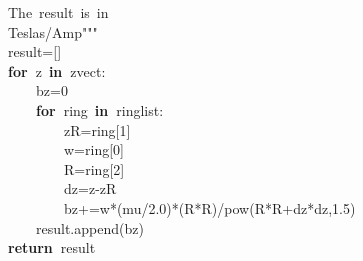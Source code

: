 \documentclass{article}
\newcommand{\hlstd}[1]{\textcolor[rgb]{0,0,0}{#1}}
\newcommand{\hlnum}[1]{\textcolor[rgb]{0.16,0.16,1}{#1}}
\newcommand{\hlstr}[1]{\textcolor[rgb]{1,0,0}{#1}}
\newcommand{\hlsym}[1]{\textcolor[rgb]{0,0,0}{#1}}
\newcommand{\hlkwa}[1]{\textcolor[rgb]{0,0,0}{\bf{#1}}}
\newcommand{\hlkwb}[1]{\textcolor[rgb]{0.51,0,0}{#1}}
\newcommand{\hlkwd}[1]{\textcolor[rgb]{0,0,0.51}{#1}}
\begin{document}
\hlstr{}\hlstd{\ \ \ \ }\hlstr{The\ result\ is\ in}\hspace*{\fill}\\
\hlstr{}\hlstd{\ \ \ \ }\hlstr{Teslas/Amp"""}\hlstd{\hspace*{\fill}\\
}\hlstd{\ \ \ \ }\hlstd{result}\hlsym{={[}{]}}\hspace*{\fill}\\
\hlstd{}\hlstd{\ \ \ \ }\hlstd{}\hlkwa{for\ }\hlstd{z\ }\hlkwa{in\ }\hlstd{zvect}\hlsym{:}\hspace*{\fill}\\
\hlstd{}\hlstd{\ \ \ \ \ \ \ \ }\hlstd{bz}\hlsym{=}\hlstd{}\hlnum{0}\hspace*{\fill}\\
\hlstd{}\hlstd{\ \ \ \ \ \ \ \ }\hlstd{}\hlkwa{for\ }\hlstd{ring\ }\hlkwa{in\ }\hlstd{ringlist}\hlsym{:}\hspace*{\fill}\\
\hlstd{}\hlstd{\ \ \ \ \ \ \ \ \ \ \ \ }\hlstd{zR}\hlsym{=}\hlstd{ring}\hlsym{{[}}\hlstd{}\hlnum{1}\hlstd{}\hlsym{{]}}\hspace*{\fill}\\
\hlstd{}\hlstd{\ \ \ \ \ \ \ \ \ \ \ \ }\hlstd{w}\hlsym{=}\hlstd{ring}\hlsym{{[}}\hlstd{}\hlnum{0}\hlstd{}\hlsym{{]}}\hspace*{\fill}\\
\hlstd{}\hlstd{\ \ \ \ \ \ \ \ \ \ \ \ }\hlstd{R}\hlsym{=}\hlstd{ring}\hlsym{{[}}\hlstd{}\hlnum{2}\hlstd{}\hlsym{{]}}\hspace*{\fill}\\
\hlstd{}\hlstd{\ \ \ \ \ \ \ \ \ \ \ \ }\hlstd{dz}\hlsym{=}\hlstd{z}\hlsym{{-}}\hlstd{zR\hspace*{\fill}\\
}\hlstd{\ \ \ \ \ \ \ \ \ \ \ \ }\hlstd{bz}\hlsym{+=}\hlstd{w}\hlsym{{*}(}\hlstd{mu}\hlsym{/}\hlstd{}\hlnum{2.0}\hlstd{}\hlsym{){*}(}\hlstd{R}\hlsym{{*}}\hlstd{R}\hlsym{)/}\hlstd{}\hlkwb{pow}\hlstd{}\hlsym{(}\hlstd{R}\hlsym{{*}}\hlstd{R}\hlsym{+}\hlstd{dz}\hlsym{{*}}\hlstd{dz}\hlsym{,}\hlstd{}\hlnum{1.5}\hlstd{}\hlsym{)}\hspace*{\fill}\\
\hlstd{}\hlstd{\ \ \ \ \ \ \ \ }\hlstd{result}\hlsym{.}\hlstd{}\hlkwd{append}\hlstd{}\hlsym{(}\hlstd{bz}\hlsym{)}\hspace*{\fill}\\
\hlstd{}\hlstd{\ \ \ \ }\hlstd{}\hlkwa{return\ }\hlstd{result\hspace*{\fill}\\
}\hlstd{\ \ \ \ }\hlstd{}\hspace*{\fill}\\
\end{document}
